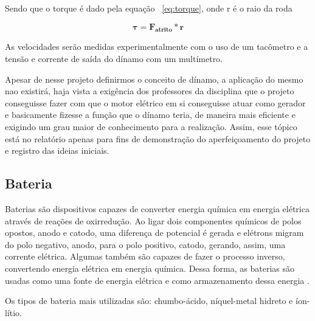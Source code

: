 Sendo que o torque é dado pela equação ~\ref{eq:torque}, onde r é o raio da roda

\begin{equation}
\label{eq:torque}
\mathbf{ \tau = F_{atrito} * r}
\end{equation}

As velocidades serão medidas experimentalmente com o uso de um tacômetro e a tensão e corrente de saída do dínamo com um multímetro.

Apesar de nesse projeto definirmos o conceito de dínamo, a aplicação do mesmo nao existirá, haja vista a exigência dos professores da disciplina que o projeto conseguisse fazer com que o motor elétrico em si conseguisse atuar como gerador e basicamente fizesse a função que o dínamo teria, de maneira mais eficiente e exigindo um grau maior de conhecimento para a realização. Assim, esse tópico está no relatório apenas para fins de demonstração do aperfeiçoamento do projeto e registro das ideias iniciais. 
  
\subsection{Bateria}
	Baterias são dispositivos capazes de converter energia química em energia elétrica através de reações de oxirredução. Ao ligar dois componentes químicos de polos opostos, anodo e catodo, uma diferença de potencial é gerada e elétrons migram do polo negativo, anodo, para o polo positivo, catodo, gerando, assim, uma corrente elétrica. Algumas também são capazes de fazer o processo inverso, convertendo energia elétrica em energia química. Dessa forma, as baterias são usadas como uma fonte de energia elétrica e como armazenamento dessa energia \cite{varela}.
	
	Os tipos de bateria mais utilizadas são: chumbo-ácido, níquel-metal hidreto e íon-lítio.
	
